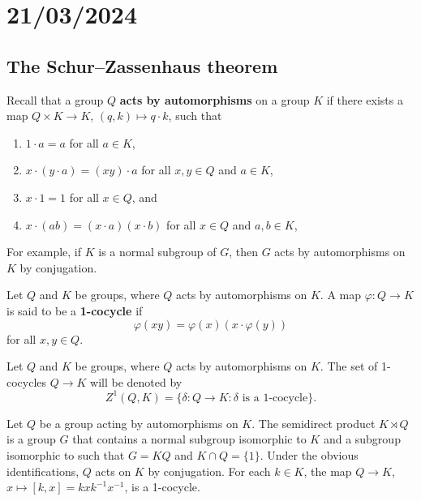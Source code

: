 \section{21/03/2024}

\subsection{The Schur--Zassenhaus theorem}


Recall that a group $Q$ \textbf{acts by automorphisms} on a group $K$ if 
there exists a map $Q\times K\to K$, $(q,k)\mapsto q\cdot k$, 
such that 
\begin{enumerate}
    \item $1\cdot a=a$ for all $a\in K$, 
    \item $x\cdot (y\cdot a)=(xy)\cdot a$ for all $x,y\in Q$ and $a\in K$, 
    \item $x\cdot 1=1$ for all $x\in Q$, and 
    \item $x\cdot (ab)=(x\cdot a)(x\cdot b)$ for all $x\in Q$ and $a,b\in K$, 
\end{enumerate}
For example, if $K$ is a normal subgroup of $G$, 
then $G$ acts by automorphisms on $K$ by conjugation. 

\begin{definition}
Let $Q$ and $K$ be groups, where $Q$ acts by automorphisms on $K$. 
A map 
$\varphi\colon Q\to K$ is said to be a \textbf{1-cocycle} if 
\[
	\varphi(xy)=\varphi(x)(x\cdot\varphi(y))
\]
for all $x,y\in Q$.  
\end{definition}

Let $Q$ and $K$ be groups, where $Q$ acts by automorphisms on $K$. 
The set of 1-cocycles $Q\to K$ will be denoted by 
\[
Z^1(Q,K)=\{\delta\colon Q\to K:\text{$\delta$ is a 1-cocycle}\}.
\]

\begin{example}
Let $Q$ be a group acting by automorphisms on $K$. 
The semidirect product $K\rtimes Q$ 
is a group $G$ that contains a normal subgroup isomorphic to $K$ 
and a subgroup isomorphic to such that 
$G=KQ$ and $K\cap Q=\{1\}$. Under the obvious identifications, 
$Q$ acts on $K$ by conjugation. For each $k\in K$, the map 
$Q\to K$, $x\mapsto [k,x]=kxk^{-1}x^{-1}$, is a 1-cocycle. 
\end{example}

